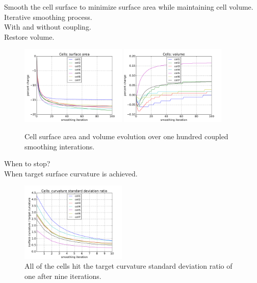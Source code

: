 \documentclass[a4paper,10pt]{article}
\begin{document}
Smooth the cell surface to minimize surface area while maintaining cell volume.\\
Iterative smoothing process.\\
With and without coupling.\\
Restore volume.\\

\begin{figure}[H]
\begin{center}
\includegraphics[width=0.45\textwidth]{images/cell_surf_100.pdf}
\includegraphics[width=0.45\textwidth]{images/cell_vol_100.pdf}
\end{center}
\caption{Cell surface area and volume evolution over one hundred coupled smoothing interations.}
\label{fig:100_iterations}
\end{figure}

When to stop?\\
When target surface curvature is achieved.\\

\begin{figure}[H]
\begin{center}
\includegraphics[width=0.45\textwidth]{images/cell_curv_std.pdf}
\end{center}
\caption{All of the cells hit the target curvature standard deviation ratio of one after nine iterations.}
\label{fig:curv_std}
\end{figure}
\end{document}
